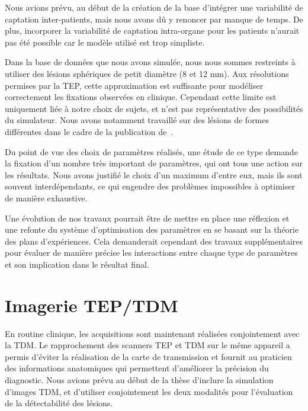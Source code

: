 Nous avions prévu, au début de la création de la base d'intégrer une variabilité
de captation inter-patients, mais nous avons dû y renoncer par manque de temps.
De plus, incorporer la variabilité de captation intra-organe pour les patients
n'aurait pas été possible car le modèle utilisé est trop simpliste.  

Dans la base de données que nous avons simulée, nous nous sommes restreints à
utiliser des lésions sphériques de petit diamètre (8 et 12 mm). Aux résolutions
permises par la TEP, cette approximation est suffisante pour modéliser
correctement les fixations observées en clinique. Cependant cette limite est
uniquement liée à notre choix de sujets, et n'est pas représentative des
possibilités du simulateur. Nous avons notamment travaillé sur des lésions de
formes différentes dans le cadre de la publication
de~\cite{le2009incorporating}.  


Du point de vue des choix de paramètres réalisés, une étude de
ce type demande la fixation d'un nombre très important de
paramètres, qui ont tous une action sur les résultats. Nous avons justifié le
choix d'un maximum d'entre eux, mais ils sont souvent interdépendants, ce qui
engendre des problèmes impossibles à optimiser de manière exhaustive.  

Une évolution de nos travaux pourrait être de mettre en place une réflexion et
une refonte du système d'optimisation des paramètres en se basant sur la théorie
des plans d'expériences. Cela demanderait cependant des travaux supplémentaires
pour évaluer de manière précise les interactions entre chaque type de paramètres
et son implication dans le résultat final. 


\section{Imagerie TEP/TDM}

En routine clinique, les acquisitions sont maintenant réalisées conjointement
avec la TDM. Le rapprochement des scanners TEP et TDM sur le même appareil a
permis d'éviter la réalisation de la carte de transmission et fournit au
praticien des informations anatomiques qui permettent d'améliorer la précision
du diagnostic. Nous avions prévu au début de la thèse d'inclure la simulation
d'images TDM, et d'utiliser conjointement les deux modalités pour l'évaluation
de la détectabilité des lésions.  

